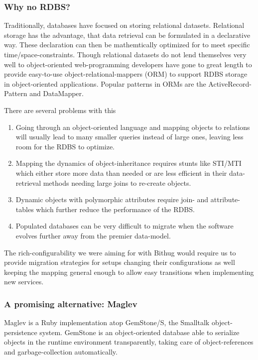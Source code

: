 \subsubsection{Why no RDBS?}
Traditionally, databases have focused on storing relational datasets. 
Relational storage has the advantage, that data retrieval can be formulated in 
a declarative way. These declaration can then be mathemtically optimized for 
to meet specific time/space-constraints.
Though relational datasets do not lend themselves very well to object-oriented 
web-programming developers have gone to great length to provide easy-to-use 
object-relational-mappers (ORM) to support RDBS storage in object-oriented 
applications. Popular patterns in ORMs are the ActiveRecord-Pattern
and DataMapper\cite{paikens-use}.

There are several problems with this
\begin{enumerate}
  \item Going through an object-oriented language and mapping objects to 
    relations will usually lead to many smaller queries instead of large 
    ones, leaving less room for the RDBS to optimize. 
  \item Mapping the dynamics of object-inheritance requires stunts like 
    STI/MTI which either store more data than needed or are less efficient in 
    their data-retrieval methods needing large joins to re-create objects.
  \item Dynamic objects with polymorphic attributes require join- and 
    attribute-tables which further reduce the performance of the RDBS.
  \item Populated databases can be very difficult to migrate when the software 
    evolves further away from the premier data-model.
\end{enumerate}

The rich-configurability we were aiming for with Bithug would require us to 
provide migration strategies for setups changing their configurations as well 
keeping the mapping general enough to allow easy transitions when implementing 
new services.
\subsubsection{A promising alternative: Maglev}
Maglev is a Ruby implementation atop GemStone/S, the Smalltalk 
object-persistence system. GemStone is an object-oriented database able to 
serialize objects in the runtime environment transparently, taking care of 
object-references and garbage-collection automatically.

